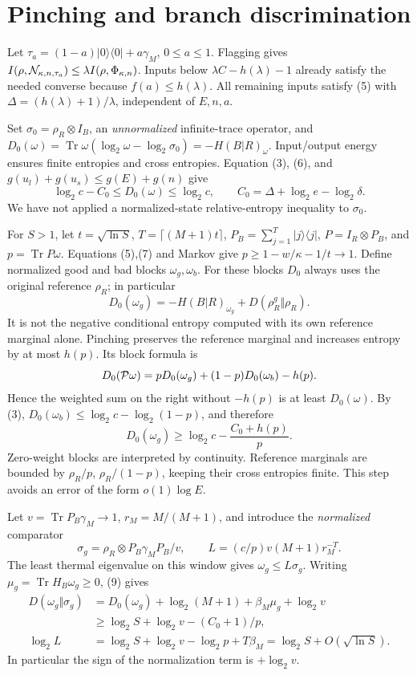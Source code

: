 \documentclass[11pt]{article}
\newcommand{\Tr}{\operatorname{Tr}}
\newcommand{\PhiT}{\Phi_{\kappa,n}}
\begin{document}
\section{Pinching and branch discrimination}
Let \(\tau_a=(1-a)|0\rangle\langle0|+a\gamma_M\), \(0\le a\le1\).
Flagging gives \(I(\rho,{\cal N}_{\kappa,n,\tau_a})
\le\lambda I(\rho,\PhiT)\).
Inputs below \(\lambda C-h(\lambda)-1\) already satisfy the needed
converse because \(f(a)\le h(\lambda)\). All remaining inputs satisfy
(5) with \(\Delta=(h(\lambda)+1)/\lambda\), independent of \(E,n,a\).

Set \(\sigma_0=\rho_R\otimes I_B\), an \emph{unnormalized}
infinite-trace operator, and
\(D_0(\omega)=\Tr\omega(\log_2\omega-\log_2\sigma_0)
=-H(B|R)_\omega\).
Input/output energy ensures finite entropies and cross entropies.
Equation (3), (6), and \(g(u_l)+g(u_s)\le g(E)+g(n)\) give
\[
 \log_2c-C_0\le D_0(\omega)\le\log_2c,\qquad
 C_0=\Delta+\log_2e-\log_2\delta.                             \tag{8}
\]
We have not applied a normalized-state relative-entropy inequality to
\(\sigma_0\).

For \(S>1\), let \(t=\sqrt{\ln S}\), \(T=\lceil(M+1)t\rceil\),
\(P_B=\sum_{j=1}^T|j\rangle\langle j|\), \(P=I_R\otimes P_B\),
and \(p=\Tr P\omega\). Equations (5),(7) and Markov give
\(p\ge1-w/\kappa-1/t\to1\).
Define normalized good and bad blocks \(\omega_g,\omega_b\).
For these blocks \(D_0\) always uses the original reference \(\rho_R\);
in particular
\[
 D_0(\omega_g)=-H(B|R)_{\omega_g}
                 +D(\rho_R^g\Vert\rho_R).
\]
It is not the negative conditional entropy computed with its own
reference marginal alone.
Pinching preserves the reference marginal and increases entropy by at
most \(h(p)\). Its block formula is
\[
 D_0({\cal P}\omega)=pD_0(\omega_g)+(1-p)D_0(\omega_b)-h(p).
\]
Hence the weighted sum on the right without \(-h(p)\) is at least
\(D_0(\omega)\). By (3),
\(D_0(\omega_b)\le\log_2c-\log_2(1-p)\), and therefore
\[
 D_0(\omega_g)\ge\log_2c-\frac{C_0+h(p)}p.                   \tag{9}
\]
Zero-weight blocks are interpreted by continuity. Reference marginals
are bounded by \(\rho_R/p\), \(\rho_R/(1-p)\), keeping their cross
entropies finite. This step avoids an error of the form \(o(1)\log E\).

Let \(v=\Tr P_B\gamma_M\to1\), \(r_M=M/(M+1)\), and introduce the
\emph{normalized} comparator
\[
 \sigma_g=\rho_R\otimes P_B\gamma_M P_B/v,\qquad
 L=(c/p)v(M+1)r_M^{-T}.
\]
The least thermal eigenvalue on this window gives \(\omega_g\le L\sigma_g\).
Writing \(\mu_g=\Tr H_B\omega_g\ge0\), (9) gives
\[
\begin{split}
 D(\omega_g\Vert\sigma_g)
 &=D_0(\omega_g)+\log_2(M+1)+\beta_M\mu_g+\log_2v\\
 &\ge\log_2S+\log_2v-(C_0+1)/p,\\
 \log_2L&=\log_2S+\log_2v-\log_2p+T\beta_M
          =\log_2S+O(\sqrt{\ln S}).
\end{split}                                                  \tag{10}
\]
In particular the sign of the normalization term is \(+\log_2v\).
\end{document}
